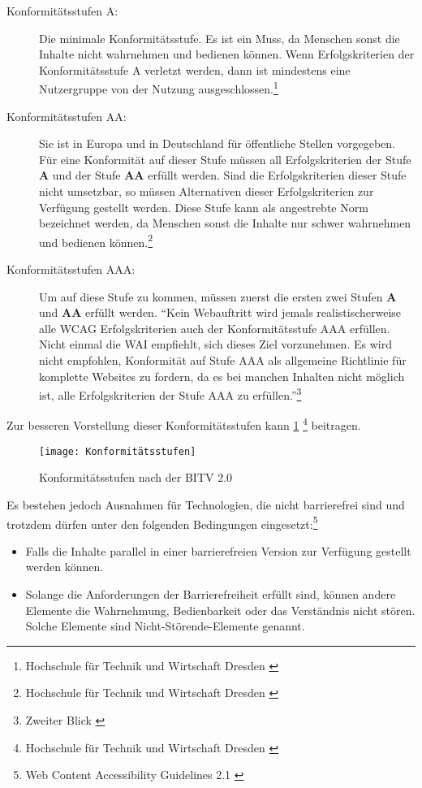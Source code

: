 \begin{description}
	\item [Konformitätsstufen A:] Die minimale Konformitätsstufe. Es ist ein Muss, da Menschen sonst die Inhalte nicht wahrnehmen und bedienen können. Wenn
	Erfolgskriterien der Konformitätsstufe A verletzt werden, dann ist mindestens eine Nutzergruppe von der Nutzung ausgeschlossen.\footnote{Hochschule für Technik und Wirtschaft Dresden \cite{HV}}
	
	\item [Konformitätsstufen AA:] Sie ist in Europa und in Deutschland für öffentliche Stellen vorgegeben. Für eine Konformität auf dieser Stufe 
	müssen all Erfolgskriterien der Stufe \textbf{A} und der Stufe \textbf{AA} erfüllt werden. Sind die Erfolgskriterien dieser Stufe nicht umsetzbar, so
	müssen Alternativen dieser Erfolgskriterien
	zur Verfügung gestellt werden. Diese Stufe kann als angestrebte Norm bezeichnet werden, da Menschen sonst die Inhalte nur schwer wahrnehmen und bedienen können.\footnote{Hochschule für Technik und Wirtschaft Dresden \cite{HV}}
	
	\item [Konformitätsstufen AAA:] Um auf diese Stufe zu kommen, müssen zuerst die ersten zwei Stufen \textbf{A} und \textbf{AA} erfüllt werden. "`Kein 
	Webauftritt wird jemals realistischerweise alle WCAG Erfolgskriterien auch der Konformitätsstufe AAA erfüllen. Nicht einmal die WAI empfiehlt, sich 
	dieses Ziel vorzunehmen. Es wird nicht empfohlen, Konformität auf Stufe AAA als allgemeine Richtlinie für komplette Websites zu fordern, da es bei manchen
	Inhalten nicht möglich ist, alle Erfolgskriterien der Stufe AAA zu erfüllen."'\footnote{Zweiter Blick \cite{ZweiterBlick}}
\end{description}

Zur besseren Vorstellung dieser Konformitätsstufen kann \cref{fig:Konformitätsstufen} \footnote{Hochschule für Technik und Wirtschaft Dresden \cite{HV}} beitragen.

\begin{figure}[H]
	\centering
	\texttt{[image: Konformitätsstufen]}
	\caption[Konformitätsstufen nach der \ac{BITV} 2.0]{Konformitätsstufen nach der \ac{BITV} 2.0}
	\label{fig:Konformitätsstufen}
\end{figure}

\vspace{2cm}

Es bestehen jedoch Ausnahmen für Technologien, die nicht barrierefrei sind und trotzdem dürfen unter den folgenden Bedingungen eingesetzt:\footnote{Web Content Accessibility Guidelines 2.1 \cite{WCAG2.1}}
\begin{itemize}
	\item Falls die Inhalte parallel in einer barrierefreien Version zur Verfügung gestellt werden können.
	\item Solange die Anforderungen der Barrierefreiheit erfüllt sind, können andere Elemente die Wahrnehmung, Bedienbarkeit oder das Verständnis nicht 
	stören. Solche Elemente sind Nicht-Störende-Elemente genannt.
\end{itemize}

